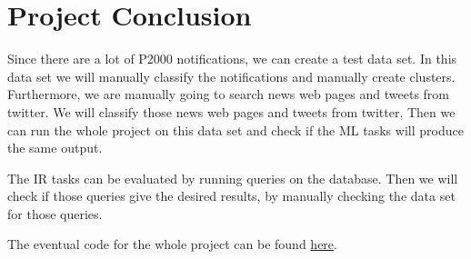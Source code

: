 \section{Project Conclusion}
Since there are a lot of P2000 notifications, we can create a test data set. 
In this data set we will manually classify the notifications and manually create clusters. 
Furthermore, we are manually going to search news web pages and tweets from twitter.
We will classify those news web pages and tweets from twitter. 
Then we can run the whole project on this data set  and check if the ML tasks will produce the same output.

The IR tasks can be evaluated by running queries on the database. 
Then we will check if those queries give the desired results, by manually checking the data set for those queries.

The eventual code for the whole project can be found \href{https://www.dropbox.com/home/Public/Code_2IMW15_Group_20}{here}.
